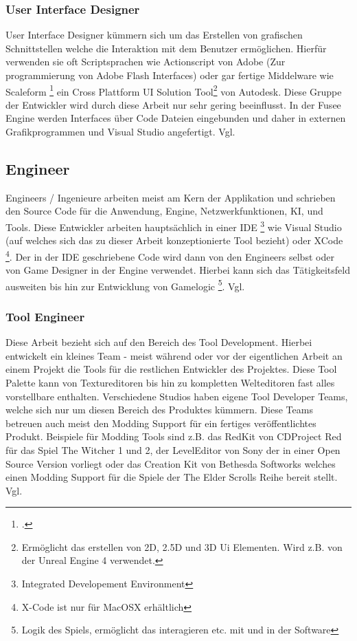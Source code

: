 \documentclass[pagesize, paper=a4, fontsize=12pt,titlepage=true, headings=small, headnosepline, abstractoff, liststotoc, nochapterprefix, plainheadsepline, twoside]{scrreprt}
\begin{document}
\subsubsection{User Interface Designer}
User Interface Designer kümmern sich um das Erstellen von grafischen Schnittstellen welche die Interaktion mit dem Benutzer ermöglichen. Hierfür verwenden sie oft Scriptsprachen wie Actionscript von Adobe (Zur programmierung von Adobe Flash Interfaces) oder gar fertige Middelware wie Scaleform \footcite{AutodeskScale2014} ein Cross Plattform UI Solution Tool\footnote{Ermöglicht das erstellen von 2D, 2.5D und 3D Ui Elementen. Wird z.B. von der Unreal Engine 4 verwendet.} von Autodesk. Diese Gruppe der Entwickler wird durch diese Arbeit nur sehr gering beeinflusst. In der Fusee Engine werden Interfaces über Code Dateien eingebunden und daher in externen Grafikprogrammen und Visual Studio angefertigt. Vgl. \autocite[S. 31]{Chandler2006}

\subsection{Engineer}
Engineers / Ingenieure arbeiten meist am Kern der Applikation und schrieben den Source Code für die Anwendung, Engine, Netzwerkfunktionen, KI, und Tools. Diese Entwickler arbeiten hauptsächlich in einer IDE \footnote{Integrated Developement Environment} wie Visual Studio (auf welches sich das zu dieser Arbeit konzeptionierte Tool bezieht) oder XCode \footnote{X-Code ist nur für MacOSX erhältlich}. Der in der IDE geschriebene Code wird dann von den Engineers selbst oder von Game Designer in der Engine verwendet. Hierbei kann sich das Tätigkeitsfeld ausweiten bis hin zur Entwicklung von Gamelogic \footnote{Logik des Spiels, ermöglicht das interagieren etc. mit und in der Software}. Vgl. \autocite[S. 26]{Chandler2006}

\subsubsection{Tool Engineer}
Diese Arbeit bezieht sich auf den Bereich des Tool Development. Hierbei entwickelt ein kleines Team - meist während oder vor der eigentlichen Arbeit an einem Projekt die Tools für die restlichen Entwickler des Projektes. Diese Tool Palette kann von Textureditoren bis hin zu kompletten Welteditoren fast alles vorstellbare enthalten. Verschiedene Studios haben eigene Tool Developer Teams, welche sich nur um diesen Bereich des Produktes kümmern. Diese Teams betreuen auch meist den Modding Support für ein fertiges veröffentlichtes Produkt. Beispiele für Modding Tools sind z.B. das RedKit von CDProject Red für das Spiel The Witcher 1 und 2, der LevelEditor von Sony der in einer Open Source Version vorliegt oder das Creation Kit von Bethesda Softworks welches einen Modding Support für die Spiele der The Elder Scrolls Reihe bereit stellt. Vgl. \autocite[S. 27 ]{Chandler2006}
\end{document}
